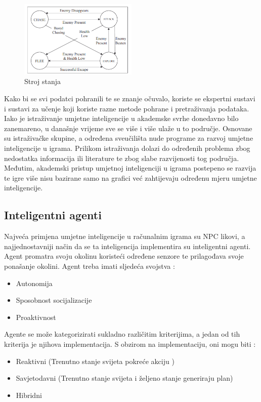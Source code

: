 \documentclass[a4paper,12pt]{foi}
\begin{document}
\begin{figure}[h]
\centering 
\includegraphics[width=0.50\textwidth]{stroj.png}
\caption{Stroj stanja \citep{NameeB2004}}
\label{slika-4}
\end{figure}

Kako bi se svi podatci pohranili te se znanje očuvalo, koriste se ekspertni sustavi i sustavi za učenje koji koriste razne metode pohrane i pretraživanja podataka.
Iako je istraživanje umjetne inteligencije u akademske svrhe donedavno bilo zanemareno, u današnje vrijeme sve se više i više ulaže u to područje. Osnovane su istraživačke skupine, a određena sveučilišta nude programe za razvoj umjetne inteligencije u igrama. Prilikom istraživanja dolazi do određenih problema zbog nedostatka informacija ili literature te zbog slabe razvijenosti tog područja. Međutim, akademski pristup umjetnoj inteligenciji u igrama postepeno se razvija te igre više nisu bazirane samo na grafici već zahtijevaju određenu mjeru umjetne inteligencije.

\subsection{Inteligentni agenti}
Najveća primjena umjetne inteligencije u računalnim igrama su NPC likovi, a najjednostavniji način da se ta inteligencija implementira su inteligentni agenti. Agent promatra svoju okolinu koristeći određene senzore te prilagođava svoje ponašanje okolini. Agent treba imati sljedeća svojstva \citep{NameeB2004}:
\begin{itemize}
\item Autonomija
\item Sposobnost socijalizacije
\item Proaktivnost
\end{itemize}

Agente se može kategorizirati sukladno različitim kriterijima, a jedan od tih kriterija je njihova implementacija. S obzirom na implementaciju, oni mogu biti \citep{NameeB2004}:
\begin{itemize}
\item Reaktivni (Trenutno stanje svijeta pokreće akciju )
\item Savjetodavni (Trenutno stanje svijeta i željeno stanje generiraju plan)
\item Hibridni
\end{itemize}
\end{document}
